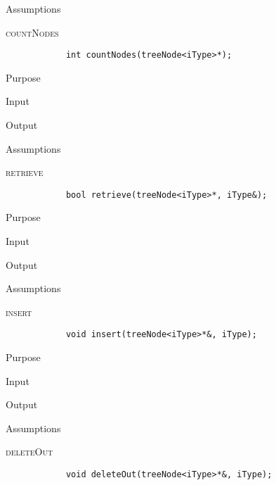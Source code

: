 \documentclass[pdftex, 12pt]{article}
\begin{document}
\begin{description}
\begin{description}
			\item{Assumptions}

		\end{description}
	\item{\textsc{countNodes}}
		\begin{lstlisting}
			int countNodes(treeNode<iType>*);
		\end{lstlisting}
		\begin{description}

			\item{Purpose}

			\item{Input}

			\item{Output}

			\item{Assumptions}

		\end{description}
	\item{\textsc{retrieve}}
		\begin{lstlisting}
			bool retrieve(treeNode<iType>*, iType&);
		\end{lstlisting}
		\begin{description}

			\item{Purpose}

			\item{Input}

			\item{Output}

			\item{Assumptions}

		\end{description}
	\item{\textsc{insert}}
		\begin{lstlisting}
			void insert(treeNode<iType>*&, iType);
		\end{lstlisting}
		\begin{description}

			\item{Purpose}

			\item{Input}

			\item{Output}

			\item{Assumptions}

		\end{description}
	\item{\textsc{deleteOut}}
		\begin{lstlisting}
			void deleteOut(treeNode<iType>*&, iType);
		\end{lstlisting}
		\begin{description}


\end{description}
\end{description}
\end{document}
